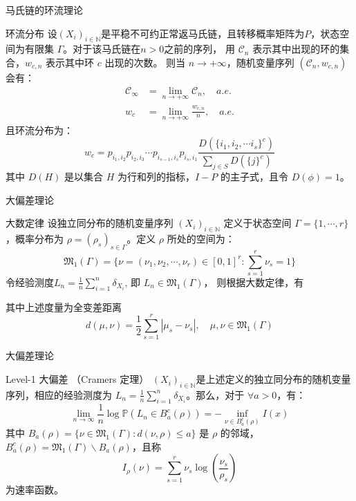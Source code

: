 \documentclass{beamer}
\begin{document}
	\begin{frame}{马氏链的环流理论}
		\begin{block}{环流分布}
			设$(\mathit{X}_i)_{i\in \mathbb{N}}$是平稳不可约正常返马氏链，且转移概率矩阵为$\mathit{P}$，状态空间为有限集 $\Gamma$。对于该马氏链在$n>0$之前的序列，
			用 $\mathcal{C}_n$ 表示其中出现的环的集合，$\mathit{w}_{c,n}$ 表示其中环 $c$ 出现的次数。
			则当 $n \rightarrow +\infty$，随机变量序列 $(\mathcal{C}_n, \mathit{w}_{c, n})$会有：
			\begin{align*}
				\mathcal{C}_{\infty} &= \lim_{n \rightarrow +\infty} \mathcal{C}_n, \quad a.e. \\
				\mathit{w}_c &= \lim_{n \rightarrow +\infty} \frac{\mathit{w}_{c,n}}{n}, \quad a.e. 
			\end{align*}
			且环流分布为：
			$$
			\mathit{w}_c = \mathit{p}_{i_1, i_2} \mathit{p}_{i_2, i_3} \cdots \mathit{p}_{i_{s-1}, i_{s}} \mathit{p}_{i_s, i_1} \frac{\mathit{D}(\{i_1, i_2, \cdots i_s\}^c)}{\sum_{j\in \mathit{S}} \mathit{D}(\{j\}^c)}
			$$
			其中 $\mathit{D}(H)$ 是以集合 $H$ 为行和列的指标，$I-P$ 的主子式，且令 $\mathit{D}(\phi) = 1$。
		\end{block}
	\end{frame}

	\begin{frame}{大偏差理论}
		\begin{block}{大数定律}
			设独立同分布的随机变量序列 $\left(\mathit{X}_i \right)_{i\in \mathbb{N}}$ 定义于状态空间 $\Gamma=\{1, \cdots, r\}$，概率分布为 $\rho=(\rho_s)_{s \in \Gamma}$。定义 $\rho$ 所处的空间为：
			$$ 
			\mathfrak{M}_1(\Gamma) = \{\nu = (\nu_1, \nu_2, \cdots, \nu_r)\in [0,1]^r:\sum_{s=1}^r \nu_s = 1\}
			$$ 
			令经验测度$\mathit{L}_n = \frac{1}{n}\sum_{i=1}^{n}\delta_{\mathit{X}_i} $, 即 $\mathit{L}_n \in \mathfrak{M}_1(\Gamma)$，
			则根据大数定律，有
			\begin{figure}
				\centering
			\end{figure}
			其中上述度量为全变差距离
			$$
			d(\mu, \nu) = \frac{1}{2} \sum_{s=1}^r |\mu_s - \nu_s|, \quad \mu, \nu \in \mathfrak{M}_1(\Gamma)
			$$
		\end{block}
	\end{frame}

	\begin{frame}{大偏差理论}
		\begin{block}{Level-1 大偏差 （Cramers 定理）}
			$(\mathit{X}_i)_{i\in \mathbb{N}}$是上述定义的独立同分布的随机变量序列，相应的经验测度为 $\mathit{L}_n = \frac{1}{n} \sum_{i=1}^n \delta_{\mathit{X}_i}$。那么，对于 $\forall a>0$，有：
			$$
			\lim_{n \rightarrow \infty} \frac{1}{n} \log \mathbb{P} \left(\mathit{L}_n \in \mathit{B}_a^c(\rho)\right) = -\inf_{\nu \in \mathit{B}_a^c(\rho)} \mathit{I}(x)
			$$
			其中 $\mathit{B}_a(\rho)=\{\nu \in \mathfrak{M}_1(\Gamma): d(\nu,  \rho) \le a\}$ 是 $\rho$ 的邻域，$\mathit{B}_a^c(\rho) = \mathfrak{M}_1(\Gamma) \backslash  \mathit{B}_a(\rho)$，且称
			$$
			\mathit{I}_{\rho}(\nu) = \sum_{s=1}^r \nu_s \log \left(\frac{\nu_s}{\rho_s}\right)
			$$
			为速率函数。
		\end{block}
	\end{frame}
\end{document}
